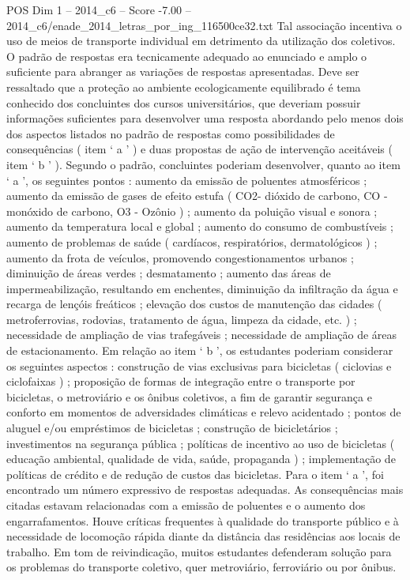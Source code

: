 \begin{textsample}{POS Dim 1 – 2014\_c6 – Score -7.00 – 2014\_c6/enade\_2014\_letras\_por\_ing\_116500ce32.txt}
Tal associação incentiva o uso de meios de transporte individual em detrimento da utilização dos coletivos.
O padrão de respostas era tecnicamente adequado ao enunciado e amplo o suficiente para abranger as variações de respostas apresentadas.
Deve ser ressaltado que a proteção ao ambiente ecologicamente equilibrado é tema conhecido dos concluintes dos cursos universitários, que deveriam possuir informações suficientes para desenvolver uma resposta abordando pelo menos dois dos aspectos listados no padrão de respostas como possibilidades de consequências ( item ‘ a ’ ) e duas propostas de ação de intervenção aceitáveis ( item ‘ b ’ ).
Segundo o padrão, concluintes poderiam desenvolver, quanto ao item ‘ a ’, os seguintes pontos : aumento da emissão de poluentes atmosféricos ; aumento da emissão de gases de efeito estufa ( CO2- dióxido de carbono, CO - monóxido de carbono, O3 - Ozônio ) ; aumento da poluição visual e sonora ; aumento da temperatura local e global ; aumento do consumo de combustíveis ; aumento de problemas de saúde ( cardíacos, respiratórios, dermatológicos ) ; aumento da frota de veículos, promovendo congestionamentos urbanos ; diminuição de áreas verdes ; desmatamento ; aumento das áreas de impermeabilização, resultando em enchentes, diminuição da infiltração da água e recarga de lençóis freáticos ; elevação dos custos de manutenção das cidades ( metroferrovias, rodovias, tratamento de água, limpeza da cidade, etc. ) ; necessidade de ampliação de vias trafegáveis ; necessidade de ampliação de áreas de estacionamento.
Em relação ao item ‘ b ’, os estudantes poderiam considerar os seguintes aspectos : construção de vias exclusivas para bicicletas ( ciclovias e ciclofaixas ) ; proposição de formas de integração entre o transporte por bicicletas, o metroviário e os ônibus coletivos, a fim de garantir segurança e conforto em momentos de adversidades climáticas e relevo acidentado ; pontos de aluguel e/ou empréstimos de bicicletas ; construção de bicicletários ; investimentos na segurança pública ; políticas de incentivo ao uso de bicicletas ( educação ambiental, qualidade de vida, saúde, propaganda ) ; implementação de políticas de crédito e de redução de custos das bicicletas.
Para o item ‘ a ’, foi encontrado um número expressivo de respostas adequadas.
As consequências mais citadas estavam relacionadas com a emissão de poluentes e o aumento dos engarrafamentos.
Houve críticas frequentes à qualidade do transporte público e à necessidade de locomoção rápida diante da distância das residências aos locais de trabalho.
Em tom de reivindicação, muitos estudantes defenderam solução para os problemas do transporte coletivo, quer metroviário, ferroviário ou por ônibus.

\end{textsample}
